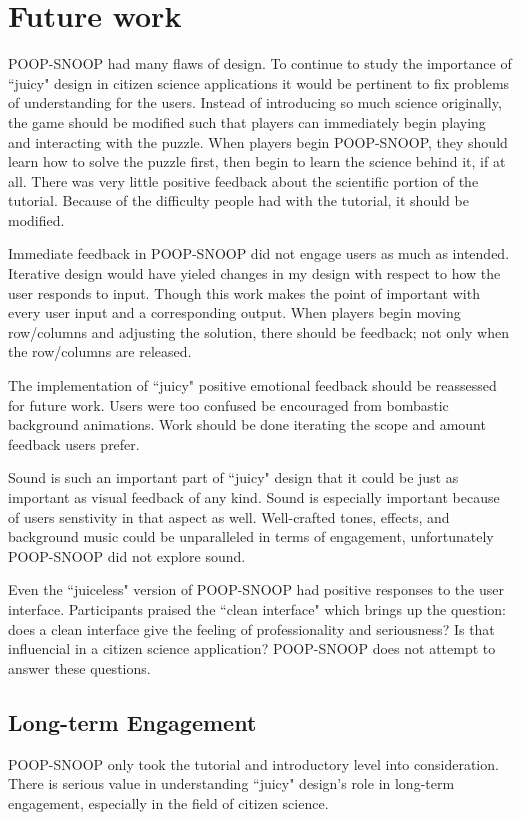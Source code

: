\chapter{Future work}

POOP-SNOOP had many flaws of design. To continue to study the importance of ``juicy" design in citizen science applications it would be pertinent to fix problems of understanding for the users. Instead of introducing so much science originally, the game should be modified such that players can immediately begin playing and interacting with the puzzle. When players begin POOP-SNOOP, they should learn how to solve the puzzle first, then begin to learn the science behind it, if at all. There was very little positive feedback about the scientific portion of the tutorial. Because of the difficulty people had with the tutorial, it should be modified.

Immediate feedback in POOP-SNOOP did not engage users as much as intended. Iterative design would have yieled changes in my design with respect to how the user responds to input. Though this work makes the point of important with every user input and a corresponding output. When players begin moving row/columns and adjusting the solution, there should be feedback; not only when the row/columns are released.

The implementation of ``juicy" positive emotional feedback should be reassessed for future work. Users were too confused be encouraged from bombastic background animations. Work should be done iterating the scope and amount feedback users prefer.

Sound is such an important part of ``juicy" design that it could be just as important as visual feedback of any kind. Sound is especially important because of users senstivity in that aspect as well. Well-crafted tones, effects, and background music could be unparalleled in terms of engagement, unfortunately POOP-SNOOP did not explore sound.

Even the ``juiceless" version of POOP-SNOOP had positive responses to the user interface. Participants praised the ``clean interface" which brings up the question: does a clean interface give the feeling of professionality and seriousness? Is that influencial in a citizen science application? POOP-SNOOP does not attempt to answer these questions.

\section{Long-term Engagement}

POOP-SNOOP only took the tutorial and introductory level into consideration. There is serious value in understanding ``juicy" design's role in long-term engagement, especially in the field of citizen science.
